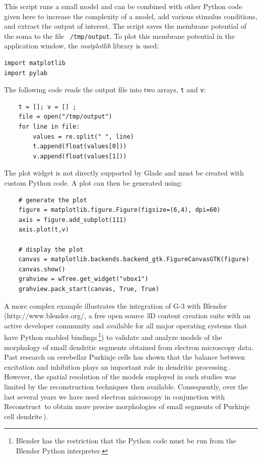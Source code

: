 \documentclass[12pt]{article}
\begin{document}
This script runs a small model and can be combined with other Python
code given here to increase the complexity of a model, add various
stimulus conditions, and extract the output of interest.  The script
saves the membrane potential of the soma to the file {\tt
  /tmp/output}.  To plot this membrane potential in the application
window, the {\it matplotlib} library is used:

{\footnotesize
  \resetlinenumber[5]
\begin{verbatim}
import matplotlib
import pylab
\end{verbatim}
}

The following code reads the output file into two arrays, {\tt t} and
{\tt v}:

{\footnotesize
  \resetlinenumber[5]
\begin{verbatim}
    t = []; v = [] ;
    file = open("/tmp/output")
    for line in file:
        values = re.split(" ", line)
        t.append(float(values[0]))
        v.append(float(values[1]))
\end{verbatim}
}

The plot widget is not directly supported by Glade and must be created
with custom Python code.  A plot can then be generated using:

{\footnotesize
  \resetlinenumber[5]
\begin{verbatim}
    # generate the plot
    figure = matplotlib.figure.Figure(figsize=(6,4), dpi=60)
    axis = figure.add_subplot(111)
    axis.plot(t,v)

    # display the plot
    canvas = matplotlib.backends.backend_gtk.FigureCanvasGTK(figure)
    canvas.show()
    grahview = wTree.get_widget("vbox1")
    grahview.pack_start(canvas, True, True)
\end{verbatim}
}

A more complex example illustrates the integration of G-3 with Blender
(http://www.blender.org/, a free open source 3D content creation suite
with an active developer community and available for all major
operating systems that have Python enabled bindings\,\footnote{Blender
  has the restriction that the Python code must be run from the
  Blender Python interpreter.}) to validate and analyze models of the
morphology of small dendritic segments obtained from electron
microscopy data. Past research on cerebellar Purkinje cells has shown
that the balance between excitation and inhibition plays an important
role in dendritic processing\,\cite{santamaria02:_modul_purkin,
  mittmann07:_linkin_purkin}.  However, the spatial resolution of the
models employed in such studies was limited by the reconstruction
techniques then available.  Consequently, over the last several years
we have used electron microscopy in conjunction with
Reconstruct\,\cite{jc05:_recon}
to obtain more precise morphologies of small segments of Purkinje cell
dendrite\,\cite{lu09:_d_purkin, cornelis08:_model_neuros_genes}).
\end{document}
